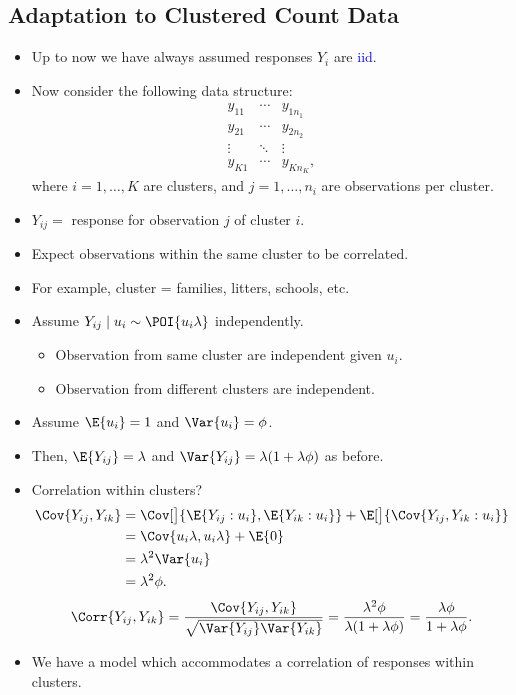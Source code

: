 \documentclass[oneside]{book}\usepackage[]{graphicx}\usepackage[svgnames]{xcolor}
\providecommand\given{} %
\renewcommand\given{\nonscript\:\delimsize\vert\nonscript\:\mathopen{}}%
\renewcommand\given{\nonscript\:\delimsize\vert\nonscript\:\mathopen{}}%
\renewcommand\given{\nonscript\:\delimsize\vert\nonscript\:\mathopen{}}%
\renewcommand\given{\nonscript\:\delimsize\vert\nonscript\:\mathopen{}}%
\renewcommand\given{\nonscript\:\delimsize\vert\nonscript\:\mathopen{}}%
\renewcommand\given{\nonscript\:\delimsize\vert\nonscript\:\mathopen{}}%
\renewcommand\given{\nonscript\:\delimsize\vert\nonscript\:\mathopen{}}%
\renewcommand\given{\nonscript\:\delimsize\vert\nonscript\:\mathopen{}}%
\renewcommand\given{\nonscript\:\delimsize\vert\nonscript\:\mathopen{}}%
\renewcommand\given{\nonscript\:\delimsize\vert\nonscript\:\mathopen{}}%
\renewcommand\given{\nonscript\:\delimsize\vert\nonscript\:\mathopen{}}%
\renewcommand\given{\nonscript\:\delimsize\vert\nonscript\:\mathopen{}}%
\renewcommand\given{:}
\begin{document}
\subsection*{Adaptation to Clustered Count Data}
\begin{itemize}
    \item Up to now we have always assumed responses $ Y_i $ are \textcolor{Blue}{iid}.
    \item Now consider the following data structure:
          \[ \begin{matrix}
                  y_{11} & \cdots & y_{1n_1}   \\
                  y_{21} & \cdots & y_{2n_2}   \\
                  \vdots & \ddots & \vdots     \\
                  y_{K1} & \cdots & y_{K n_K},
              \end{matrix} \]
          where $ i=1,\ldots,K $ are clusters, and $ j=1,\ldots,n_i $ are observations per cluster.
    \item $ Y_{ij}= $ response for observation $ j $ of cluster $ i $.
    \item Expect observations within the same cluster to be correlated.
    \item For example, cluster = families, litters, schools, etc.
    \item Assume $ Y_{ij}\mid u_i \sim \POI{u_i\lambda} $ independently.
          \begin{itemize}
              \item Observation from same cluster are independent given $ u_i $.
              \item Observation from different clusters are independent.
          \end{itemize}
    \item Assume $ \E{u_i}=1 $ and $ \Var{u_i}=\phi $.
    \item Then, $ \E{Y_{ij}}=\lambda $ and $ \Var{Y_{ij}}=\lambda(1+\lambda\phi) $ as before.
    \item Correlation within clusters?
          \begin{align*}
              \Cov{Y_{ij},Y_{ik}}
               & =\Cov[\big]{ \E{Y_{ij}\given u_i},\E{Y_{ik}\given u_i} } + \E[\big]{\Cov{Y_{ij},Y_{ik}\given u_i}} \\
               & =\Cov{u_i\lambda,u_i\lambda}+\E{0}                                                                 \\
               & =\lambda^2\Var{u_i}                                                                                \\
               & =\lambda^2\phi.
          \end{align*}
          \[ \Corr{Y_{ij},Y_{ik}}=\frac{\Cov{Y_{ij},Y_{ik}}}{\sqrt{\Var{Y_{ij}}\Var{Y_{ik}} }}=\frac{\lambda^2\phi}{\lambda(1+\lambda\phi)}=\frac{\lambda\phi}{1+\lambda\phi}. \]
    \item We have a model which accommodates a correlation of responses within clusters.
\end{itemize}
\end{document}

